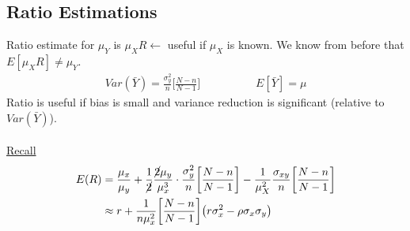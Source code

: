 \subsection*{Ratio Estimations}
Ratio estimate for $\mu_Y$ is $\mu_X R \leftarrow$ useful if $\mu_X$ is known. We know from before that $E[\mu_X R] \neq \mu_Y$.
\begin{gather*}
	Var(\bar{Y}) = \frac{\sigma_y^2}{n}\bigg[ \frac{N-n}{N-1} \bigg] \hspace{5em} E[\bar{Y}] = \mu 
\end{gather*}
Ratio is useful if bias is small and variance reduction is significant (relative to $Var(\bar{Y})$).\\\\
\underline{Recall}
\begin{align*}
	E(R) & = \frac{\mu_x}{\mu_y} + \frac{1}{\cancel{2}} \frac{\cancel{2} \mu_y}{\mu_x^3} \cdot \frac{\sigma_y^2}{n}\bigg[ \frac{N-n}{N-1} \bigg] - \frac{1}{\mu_X^2} \frac{\sigma_{xy}}{n}\bigg[ \frac{N-n}{N-1} \bigg]\\
	& \approx r + \frac{1}{n \mu_x^2} \bigg[ \frac{N-n}{N-1} \bigg] \big(r\sigma_x^2 - \rho \sigma_x \sigma_y \big)
\end{align*}
